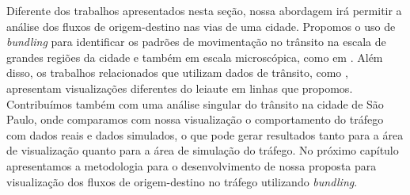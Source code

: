   Diferente dos trabalhos apresentados nesta seção, nossa abordagem irá
permitir a análise dos fluxos de origem-destino nas vias de uma cidade.
Propomos o uso de \emph{bundling} para identificar os padrões de movimentação
no trânsito na escala de grandes regiões da cidade e também em escala
microscópica, como em \citet{Guo2011}.  Além disso, os trabalhos relacionados
que utilizam dados de trânsito, como \citet{Andrienko2017, Ferreira2013,
Guo2011}, apresentam visualizações diferentes do leiaute em linhas que
propomos. Contribuímos também com uma análise singular do trânsito na cidade de
São Paulo, onde comparamos com nossa visualização o comportamento do tráfego
com dados reais e dados simulados, o que pode gerar resultados tanto para a
área de visualização quanto para a área de simulação do tráfego. No próximo
capítulo apresentamos a metodologia para o desenvolvimento de nossa proposta
para visualização dos fluxos de origem-destino no tráfego utilizando
\emph{bundling}.

